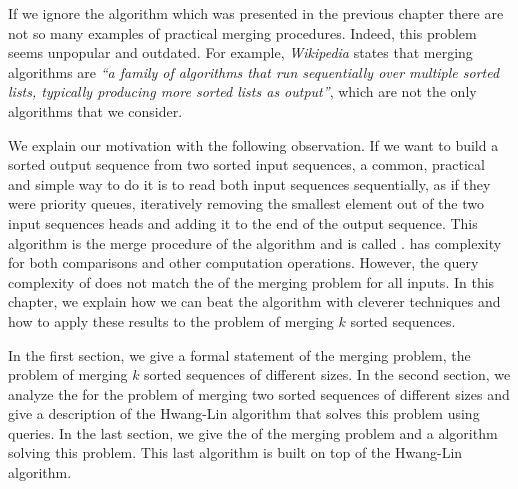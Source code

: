 \label{tree:merging:intro}

If we ignore the \mergesort algorithm which was presented in
the previous chapter there are not so many examples of practical merging
procedures. Indeed, this problem seems unpopular and outdated. For example,
\emph{Wikipedia} states that merging algorithms are \emph{``a family of algorithms
that run sequentially over multiple sorted lists, typically producing more
sorted lists as output''}, which are not the only algorithms that we
consider.

We explain our motivation with the following observation.
If we want to build a sorted output sequence from two sorted input sequences, a
common, practical and simple way to do it is to read both input sequences
sequentially, as if they were priority queues, iteratively removing the
smallest element out of the two input sequences heads and adding it to the end
of the output sequence. This algorithm is the merge procedure of the \mergesort
algorithm and is called \tapemerge. \tapemerge has  complexity for
both comparisons and other computation operations. However, the query
complexity of \tapemerge does not match the \ITLB of the merging problem for all
inputs. In this chapter, we explain how we can beat the \tapemerge algorithm
with cleverer techniques and how to apply these results to the problem of
merging \(k\) sorted sequences.

In the first section, we give a formal statement of the merging problem, \ie
the problem of merging \(k\) sorted sequences of different sizes. In the second
section, we analyze the \ITLB for the problem of merging two sorted sequences of
different sizes and give a description of the Hwang-Lin algorithm
\cite{DBLP:journals/siamcomp/HwangL72} that solves this problem using
\BigO{\ITLB} queries. In the last section, we give the \ITLB of the merging
problem and a \BigO{\ITLB} algorithm solving this problem. This last
algorithm is built on top of the Hwang-Lin algorithm.
